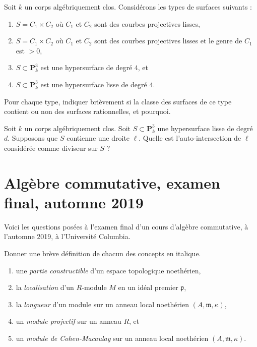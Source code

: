 \begin{exercise}
\label{exercise-rational-surface}
Soit $k$ un corps algébriquement clos. Considérons les types
de surfaces suivants :
\begin{enumerate}
\item $S = C_1 \times C_2$ où $C_1$ et $C_2$ sont des courbes projectives lisses,
\item $S = C_1 \times C_2$ où $C_1$ et $C_2$ sont des courbes projectives lisses
et le genre de $C_1$ est $> 0$,
\item $S \subset \mathbf{P}^3_k$ est une hypersurface de degré $4$, et
\item $S \subset \mathbf{P}^3_k$ est une hypersurface lisse de degré $4$.
\end{enumerate}
Pour chaque type, indiquer brièvement si la classe des surfaces de
ce type contient ou non des surfaces rationnelles, et pourquoi.
\end{exercise}

\begin{exercise}
\label{exercise-self-square-line}
Soit $k$ un corps algébriquement clos. Soit $S \subset \mathbf{P}^3_k$
une hypersurface lisse de degré $d$. Supposons que $S$ contienne une
droite $\ell$. Quelle est l'auto-intersection de $\ell$ considérée comme diviseur sur $S$ ?
\end{exercise}






\section{Algèbre commutative, examen final, automne 2019}
\label{section-final-exam-fall-2019}

\noindent
Voici les questions posées à l'examen final d'un cours d'algèbre commutative,
à l'automne 2019, à l'Université Columbia.

\begin{exercise}[Définitions]
\label{exercise-definitions-fall-2019}
Donner une brève définition de chacun des concepts en italique.
\begin{enumerate}
\item une {\it partie constructible} d'un espace topologique noethérien,
\item la {\it localisation} d'un $R$-module $M$ en un idéal premier $\mathfrak p$,
\item la {\it longueur} d'un module sur un anneau local noethérien
$(A, \mathfrak m, \kappa)$,
\item un {\it module projectif} sur un anneau $R$, et
\item un {\it module de Cohen-Macaulay} sur un
anneau local noethérien $(A, \mathfrak m, \kappa)$.
\end{enumerate}
\end{exercise}

